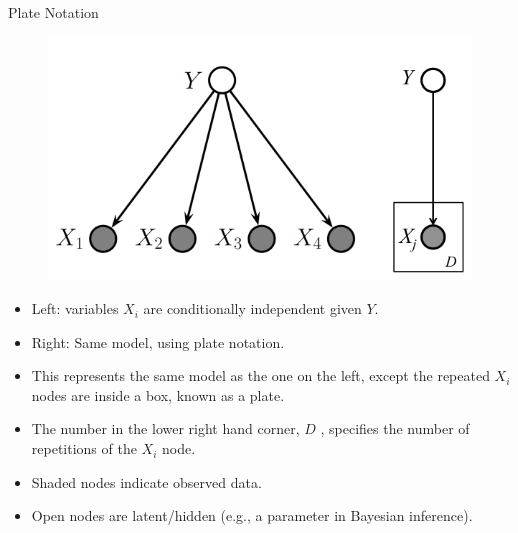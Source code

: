 \documentclass[handout]{beamer}
\begin{document}
\begin{frame}{Plate Notation}
\scriptsize{


\begin{figure}[h!]
	\centering
	\includegraphics[scale=0.35]{pics/plate.png}
	\end{figure} 


\begin{itemize}
\item Left: variables $X_i$ are conditionally independent given $Y$. 
\item Right: Same model, using plate notation. 
\item This represents the same model as the one on the left, except the repeated $X_i$ nodes are inside a box, known as a plate.
\item The number in the lower right hand corner, $D$ , specifies the number of repetitions of the $X_i$ node. 
\item  Shaded nodes indicate observed data. 
\item Open nodes are latent/hidden (e.g., a parameter in Bayesian inference).

\end{itemize}



} 

\end{frame}
\end{document}
